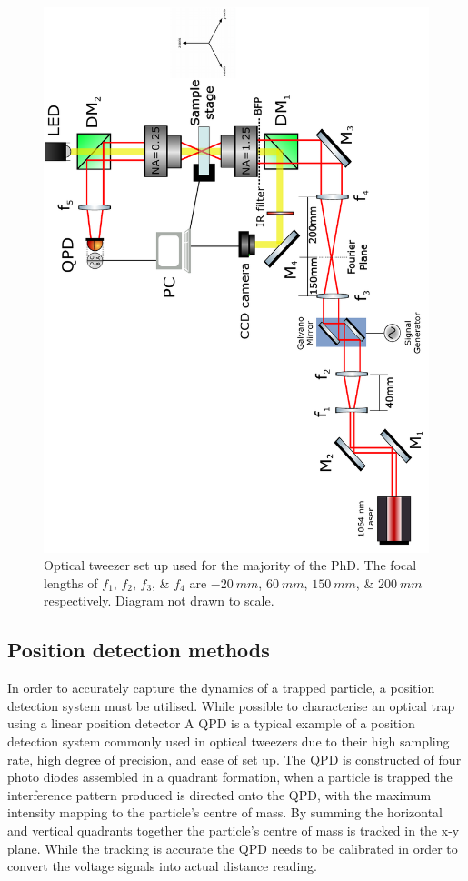 \begin{figure}
	\label{fig:setup}
	\centering
	\includegraphics[height=\linewidth, angle=270]{tweezer_setup.pdf}
	\caption{Optical tweezer set up used for the majority of the PhD. The focal lengths of $f_1$, $f_2$, $f_3$, \& $f_4$ are $-20\ mm$, $60\ mm$, $150\ mm$, \& $200\ mm$ respectively. Diagram not drawn to scale.}
\end{figure}

\subsection{Position detection methods}
In order to accurately capture the dynamics of a trapped particle, 
a position detection system must be utilised. While possible to characterise
an optical trap using a linear position detector
A QPD is a typical example of a position detection system commonly used 
in optical tweezers due to their high sampling rate, high degree of 
precision, and ease of set up. The QPD is constructed of four photo 
diodes assembled in a quadrant formation, when a particle is trapped the 
interference pattern produced is directed onto the QPD, with the maximum 
intensity mapping to the particle's centre of mass. By summing the 
horizontal and vertical quadrants together the particle's centre of mass 
is tracked in the x-y plane. While the tracking is accurate the QPD 
needs to be calibrated in order to convert the voltage signals into 
actual distance reading. 


